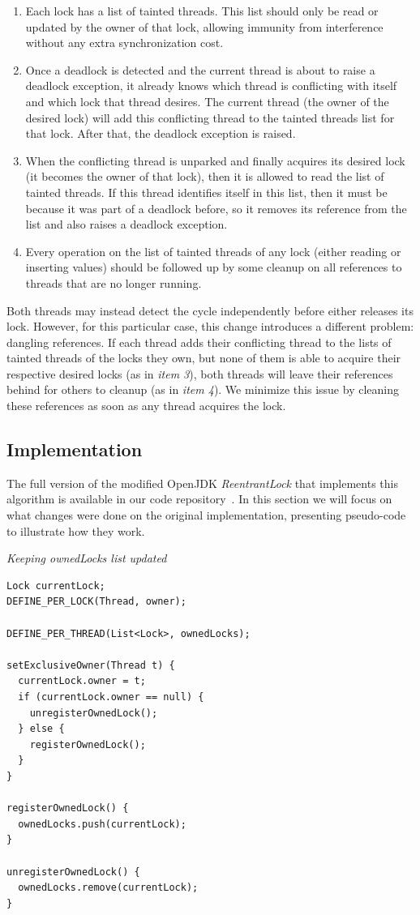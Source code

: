 \begin{enumerate}
\item Each lock has a list of tainted threads. This list should only be read or updated by the owner of that lock, allowing immunity from interference without any extra synchronization cost.
\item Once a deadlock is detected and the current thread is about to raise a deadlock exception, it already knows which thread is conflicting with itself and which lock that thread desires. The current thread (the owner of the desired lock) will add this conflicting thread to the tainted threads list for that lock. After that, the deadlock exception is raised.
\item When the conflicting thread is unparked and finally acquires its desired lock (it becomes the owner of that lock), then it is allowed to read the list of tainted threads. If this thread identifies itself in this list, then it must be because it was part of a deadlock before, so it removes its reference from the list and also raises a deadlock exception.
\item Every operation on the list of tainted threads of any lock (either reading or inserting values) should be followed up by some cleanup on all references to threads that are no longer running.
\end{enumerate}

Both threads may instead detect the cycle independently before either releases its lock. However, for this particular case, this change introduces a different problem: dangling references.
If each thread adds their conflicting thread to the lists of tainted threads of the locks they own, 
but none of them is able to acquire their respective desired locks (as in \emph{item 3}),
both threads will leave their references behind for others to cleanup (as in \emph{item 4}).
We minimize this issue by cleaning these references as soon as any thread acquires the lock.

\subsection{Implementation}

The full version of the modified OpenJDK \emph{ReentrantLock} that implements this algorithm is available in our code repository~\cite{repo}.
In this section we will focus on what changes were done on the original implementation, presenting pseudo-code to illustrate how they work.

\medskip
\noindent
{\it Keeping ownedLocks list updated}
\begin{verbatim}
Lock currentLock;
DEFINE_PER_LOCK(Thread, owner);

DEFINE_PER_THREAD(List<Lock>, ownedLocks);

setExclusiveOwner(Thread t) {
  currentLock.owner = t;
  if (currentLock.owner == null) {
    unregisterOwnedLock();
  } else {
    registerOwnedLock();
  }
}

registerOwnedLock() {
  ownedLocks.push(currentLock);
}

unregisterOwnedLock() {
  ownedLocks.remove(currentLock);
}
\end{verbatim}

